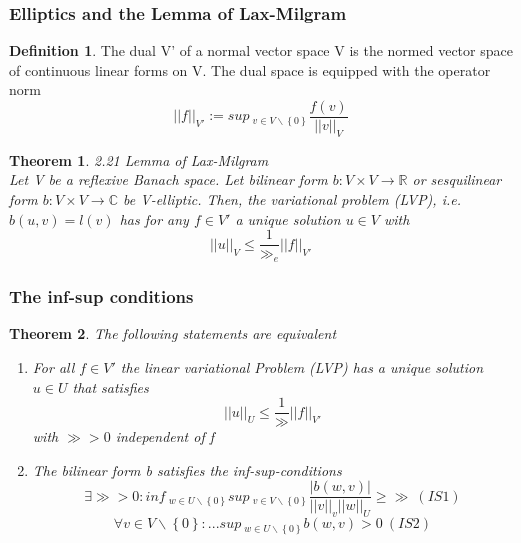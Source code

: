 \documentclass[english]{article}
\newtheorem*{theorem}{Theorem}
\theoremstyle{definition}
\newtheorem*{defi}{Definition}
\theoremstyle{remark}
\newcommand{\f}[2]{\frac{#1}{#2}}							%
\newcommand{\RR}{\mathbb{R}}			%
\newcommand{\CC}{\mathbb{C}}			%
\begin{document}
  \subsubsection{Elliptics and the Lemma of Lax-Milgram}
  \begin{defi} The dual V' of a normal vector space V is the normed vector space of continuous linear forms on V. The dual space is equipped with the operator norm 
    $$||f||_{V'} := sup\ _{v \in V\backslash \left\{0\right\}} \f{f(v)}{||v||_V}$$
  \end{defi}
  \begin{theorem}2.21 Lemma of Lax-Milgram\\
    Let V be a reflexive Banach space. Let bilinear form $b:V \times V \to \RR$ or sesquilinear form $b:V\times V \to \CC$ be V-elliptic. Then, the variational problem (LVP), i.e. $b(u,v) = l(v)$ has for any $f \in V'$ a unique solution $u \in V$ with 
    $$||u||_V \leq \f{1}{\gg_e}||f||_{V'}$$
  \end{theorem}
  \subsubsection{ The inf-sup conditions }
  \begin{theorem}
    The following statements are equivalent
    \begin{enumerate}
    \item For all $f \in V'$ the linear variational Problem (LVP) has a unique solution $u \in U$ that satisfies 
      $$||u||_U \leq \f{1}{\gg}||f||_{V'}$$
      with $\gg>0$ independent of f\\
    \item The bilinear form b satisfies the \emph{inf-sup-conditions}
      $$\exists \gg >0: inf\ _{w \in U \backslash\left\{0\right\} } sup\ _{v \in V \backslash \left\{0\right\}} \f{|b(w,v)|}{||v||_v||w||_U} \geq \gg \ (IS1)$$
      $$\forall v \in V \backslash\left\{0\right\} : ... sup\ _{w \in U \backslash\left\{0\right\}} b(w,v)>0 \ (IS2)$$
    \end{enumerate}
  \end{theorem}
  
  
\end{document}
